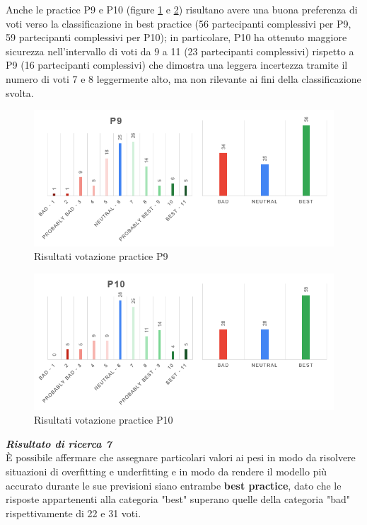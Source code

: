 Anche le practice P9 e P10 (figure \ref{im-a-prac-10} e \ref{im-a-prac-11}) risultano avere una buona preferenza di voti verso la classificazione in best practice (56 partecipanti complessivi per P9, 59 partecipanti complessivi per P10); in particolare, P10 ha ottenuto maggiore sicurezza nell'intervallo di voti da 9 a 11 (23 partecipanti complessivi) rispetto a P9 (16 partecipanti complessivi) che dimostra una leggera incertezza tramite il numero di voti 7 e 8 leggermente alto, ma non rilevante ai fini della classificazione svolta.

\begin{figure}[h!]
    \centering
    \includegraphics[width=1\textwidth]{figure/data-analysis3/P9.png}
    \caption{Risultati votazione practice P9}
    \label{im-a-prac-10}
\end{figure}
\begin{figure}[h!]
    \centering
    \includegraphics[width=1\textwidth]{figure/data-analysis3/P10.png}
    \caption{Risultati votazione practice P10}
    \label{im-a-prac-11}
\end{figure}

\begin{center}
    \begin{tcolorbox}[width=400pt, colframe=black, colback=Gray!30]
		\begin{minipage}{\textwidth}
			\textit{\faKey \textbf{ Risultato di ricerca 7}}\\
			È possibile affermare che assegnare particolari valori ai pesi in modo da risolvere situazioni di overfitting e underfitting e in modo da rendere il modello più accurato durante le sue previsioni siano entrambe \textbf{best practice}, dato che le risposte appartenenti alla categoria "best" superano quelle della categoria "bad" rispettivamente di 22 e 31 voti.
		\end{minipage}
	\end{tcolorbox}
\end{center}

